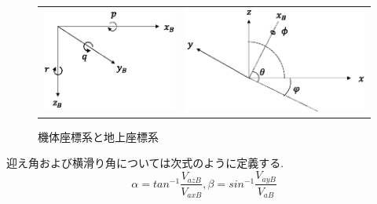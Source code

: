 \documentclass[a4paper]{jarticle}
\begin{document}
\begin{figure}[h]
  \begin{tabular}{cc}
    \begin{minipage}[t]{0.45\hsize}
      \centering
       \includegraphics[keepaspectratio, scale=0.5]{./figure1.eps}
       \caption{機体座標系}
       \label{fig:one}
      \end{minipage} &

    \begin{minipage}[t]{0.45\hsize}
      \centering
      \includegraphics[keepaspectratio, scale=0.5]{./figure2.eps}
      \caption{機体座標系と地上座標系}
      \label{fig:two}
    \end{minipage}
  \end{tabular}
\end{figure}

迎え角および横滑り角については次式のように定義する.
\begin{equation}
  \alpha = tan^{-1} \frac{V_{azB}}{V_{axB}},  \beta = sin^{-1} \frac{V_{ayB}}{V_{aB}}
\end{equation}
\end{document}
